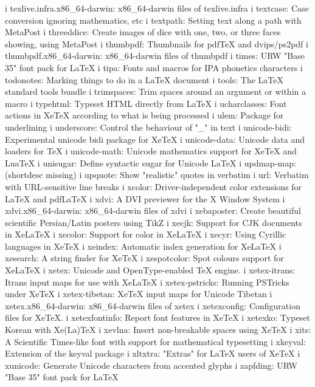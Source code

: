 i texlive.infra.x86_64-darwin: x86_64-darwin files of texlive.infra
i textcase: Case conversion ignoring mathematics, etc
i textpath: Setting text along a path with MetaPost
i threeddice: Create images of dice with one, two, or three faces showing, using MetaPost
i thumbpdf: Thumbnails for pdfTeX and dvips/ps2pdf
i thumbpdf.x86_64-darwin: x86_64-darwin files of thumbpdf
i times: URW "Base 35" font pack for LaTeX
i tipa: Fonts and macros for IPA phonetics characters
i todonotes: Marking things to do in a LaTeX document
i tools: The LaTeX standard tools bundle
i trimspaces: Trim spaces around an argument or within a macro
i typehtml: Typeset HTML directly from LaTeX
i ucharclasses: Font actions in XeTeX according to what is being processed
i ulem: Package for underlining
i underscore: Control the behaviour of "_" in text
i unicode-bidi: Experimental unicode bidi package for XeTeX
i unicode-data: Unicode data and loaders for TeX
i unicode-math: Unicode mathematics support for XeTeX and LuaTeX
i unisugar: Define syntactic sugar for Unicode LaTeX
i updmap-map: (shortdesc missing)
i upquote: Show "realistic" quotes in verbatim
i url: Verbatim with URL-sensitive line breaks
i xcolor: Driver-independent color extensions for LaTeX and pdfLaTeX
i xdvi: A DVI previewer for the X Window System
i xdvi.x86_64-darwin: x86_64-darwin files of xdvi
i xebaposter: Create beautiful scientific Persian/Latin posters using TikZ
i xecjk: Support for CJK documents in XeLaTeX
i xecolor: Support for color in XeLaTeX
i xecyr: Using Cyrillic languages in XeTeX
i xeindex: Automatic index generation for XeLaTeX
i xesearch: A string finder for XeTeX
i xespotcolor: Spot colours support for XeLaTeX
i xetex: Unicode and OpenType-enabled TeX engine.
i xetex-itrans: Itrans input maps for use with XeLaTeX
i xetex-pstricks: Running PSTricks under XeTeX
i xetex-tibetan: XeTeX input maps for Unicode Tibetan
i xetex.x86_64-darwin: x86_64-darwin files of xetex
i xetexconfig: Configuration files for XeTeX.
i xetexfontinfo: Report font features in XeTeX
i xetexko: Typeset Korean with Xe(La)TeX
i xevlna: Insert non-breakable spaces using XeTeX
i xits: A Scientific Times-like font with support for mathematical typesetting
i xkeyval: Extension of the keyval package
i xltxtra: "Extras" for LaTeX users of XeTeX
i xunicode: Generate Unicode characters from accented glyphs
i zapfding: URW "Base 35" font pack for LaTeX
